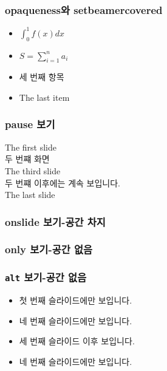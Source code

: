 \documentclass[xcolor=table]{beamer}
\begin{document}
\begin{frame}
\frametitle{opaqueness와 setbeamercovered}
\begin{itemize}
\item<1> $\int_0^1 f(x) dx$
\item<2> $S = \sum_{i=1}^n a_i$
\item<3> 세 번째 항목
\item<4> The last item
\end{itemize}
\end{frame}

\begin{frame}
\frametitle{pause 보기}
The first slide \\
\pause
두 번쨰 화면 \\ 
\pause
The third slide \\
\pause[2]
두 번쨰 이후에는 계속 보입니다. \\
\pause
The last slide \\
\end{frame}

\begin{frame}
\frametitle{onslide 보기-공간 차지}
\end{frame}

\begin{frame}
\frametitle{only 보기-공간 없음}
\end{frame}

\begin{frame}
\frametitle{\texttt{alt} 보기-공간 없음}
\begin{itemize}
\item<1>{첫 번째 슬라이드에만 보입니다. \newline}
\item<2> 
{네 번째 슬라이드에만 보입니다. \newline}
\item<3->{세 번째 슬라이드 이후 보입니다. \newline}
\item<4>{네 번째 슬라이드에만 보입니다.}
\end{itemize}
\end{frame}
\end{document}
